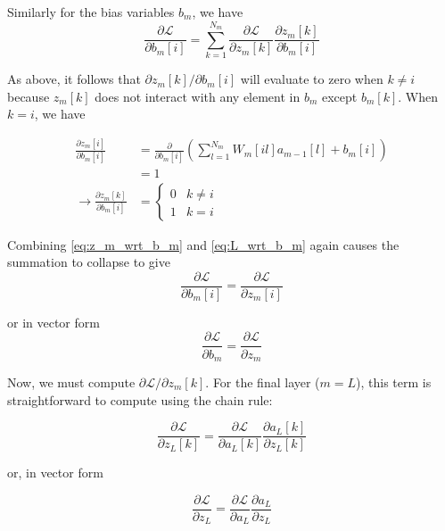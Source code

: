 Similarly for the bias variables $b_m$, we have
\begin{equation}
\frac{\partial \mathcal{L}}{\partial b_m[i]} = \sum_{k = 1}^{N_m} \frac{\partial \mathcal{L}}{\partial z_m[k]} \frac{\partial z_m[k]}{\partial b_m[i]}
\label{eq:L_wrt_b_m}
\end{equation}

As above, it follows that $\partial z_m[k]/\partial b_m[i]$ will evaluate to zero when $k \ne i$ because $z_m[k]$ does not interact with any element in $b_m$ except $b_m[k]$.  When $k = i$, we have

\begin{align}
\frac{\partial z_m[i]}{\partial b_m[i]} &= \frac{\partial}{\partial b_m[i]}\left(\sum_{l = 1}^{N_m} W_m[il] a_{m - 1}[l] + b_m[i]\right)\\
                                        &= 1\\
\rightarrow \frac{\partial z_m[k]}{\partial b_m[i]} &= \begin{cases}
0 & k \ne i\\
1 & k = i
\end{cases}
\label{eq:z_m_wrt_b_m}
\end{align}

Combining \cref{eq:z_m_wrt_b_m} and \cref{eq:L_wrt_b_m} again causes the summation to collapse to give
\begin{equation}
\frac{\partial \mathcal{L}}{\partial b_m[i]} = \frac{\partial \mathcal{L}}{\partial z_m[i]}
\end{equation}

or in vector form
\begin{equation}
\frac{\partial \mathcal{L}}{\partial b_m} = \frac{\partial \mathcal{L}}{\partial z_m}
\end{equation}

Now, we must compute $\partial \mathcal{L}/\partial z_m[k]$.
For the final layer ($m = L$), this term is straightforward to compute using the chain rule:

\begin{equation}
        \frac{\partial \mathcal{L}}{\partial z_L[k]} = \frac{\partial \mathcal{L}}{\partial a_L[k]} \frac{\partial a_L[k]}{\partial z_L[k]}
\end{equation}

or, in vector form

\begin{equation}
        \frac{\partial \mathcal{L}}{\partial z_L} = \frac{\partial \mathcal{L}}{\partial a_L} \frac{\partial a_L}{\partial z_L}
\end{equation}

